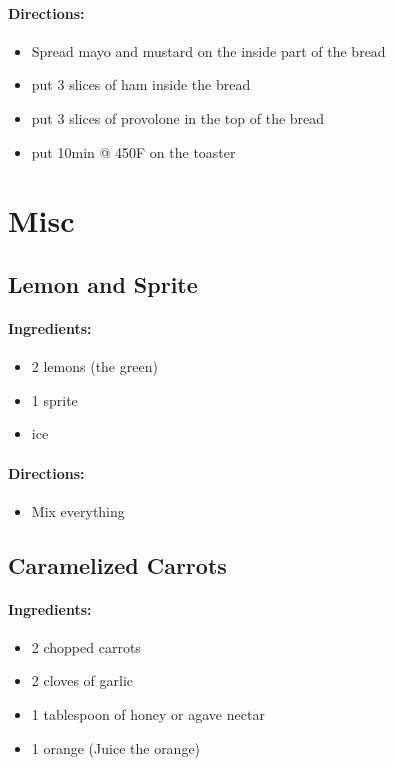 \documentclass{article}
\begin{document}
\paragraph{Directions:}
\begin{itemize}
	\item Spread mayo and mustard on the inside part of the bread 
	\item put 3 slices of ham inside the bread 
	\item put 3 slices of provolone in the top of the bread 
	\item put 10min @ 450F on the toaster 
\end{itemize}

\section{Misc}

\subsection{Lemon and Sprite}

\paragraph{Ingredients:}

\begin{itemize}
	\item 2 lemons (the green)
	\item 1 sprite
	\item ice
\end{itemize}

\paragraph{Directions:}
\begin{itemize}
	\item Mix everything
\end{itemize}

\subsection{Caramelized Carrots}

\paragraph{Ingredients:}

\begin{itemize}
	\item 2 chopped carrots
	\item 2 cloves of garlic
	\item 1 tablespoon of honey or agave nectar
	\item 1 orange (Juice the orange)
\end{itemize}
\end{document}
